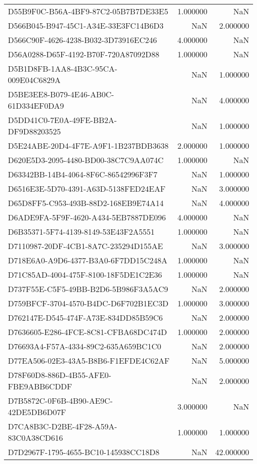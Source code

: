 \begin{tabular}{lrr}
D55B9F0C-B56A-4BF9-87C2-05B7B7DE33E5 & 1.000000 & NaN \\
D566B045-B947-45C1-A34E-33E3FC14B6D3 & NaN & 2.000000 \\
D566C90F-4626-4238-B032-3D73916EC246 & 4.000000 & NaN \\
D56A0288-D65F-4192-B70F-720A87092D88 & 1.000000 & NaN \\
D5B1D8FB-1AA8-4B3C-95CA-009E04C6829A & NaN & 1.000000 \\
D5BE3EE8-B079-4E46-AB0C-61D334EF0DA9 & NaN & 4.000000 \\
D5DD41C0-7E0A-49FE-BB2A-DF9D88203525 & NaN & 1.000000 \\
D5E24ABE-20D4-4F7E-A9F1-1B237BDB3638 & 2.000000 & 1.000000 \\
D620E5D3-2095-4480-BD00-38C7C9AA074C & 1.000000 & NaN \\
D63342BB-14B4-4064-8F6C-86542996F3F7 & NaN & 1.000000 \\
D6516E3E-5D70-4391-A63D-5138FED24EAF & NaN & 3.000000 \\
D65D8FF5-C953-493B-88D2-168EB9E74A14 & NaN & 4.000000 \\
D6ADE9FA-5F9F-4620-A434-5EB7887DE096 & 4.000000 & NaN \\
D6B35371-5F74-4139-8149-53E43F2A5551 & 1.000000 & NaN \\
D7110987-20DF-4CB1-8A7C-235294D155AE & NaN & 3.000000 \\
D718E6A0-A9D6-4377-B3A0-6F7DD15C248A & 1.000000 & NaN \\
D71C85AD-4004-475F-8100-18F5DE1C2E36 & 1.000000 & NaN \\
D737F55E-C5F5-49BB-B2D6-5B986F3A5AC9 & NaN & 2.000000 \\
D759BFCF-3704-4570-B4DC-D6F702B1EC3D & 1.000000 & 3.000000 \\
D762147E-D545-474F-A73E-834DD85B59C6 & NaN & 2.000000 \\
D7636605-E286-4FCE-8C81-CFBA68DC474D & 1.000000 & 2.000000 \\
D76693A4-F57A-4334-89C2-635A659BC1C0 & NaN & 2.000000 \\
D77EA506-02E3-43A5-B8B6-F1EFDE4C62AF & NaN & 5.000000 \\
D78F60D8-886D-4B55-AFE0-FBE9ABB6CDDF & NaN & 2.000000 \\
D7B5872C-0F6B-4B90-AE9C-42DE5DB6D07F & 3.000000 & NaN \\
D7CA8B3C-D2BE-4F28-A59A-83C0A38CD616 & 1.000000 & 1.000000 \\
D7D2967F-1795-4655-BC10-145938CC18D8 & NaN & 42.000000 \\

\end{tabular}
